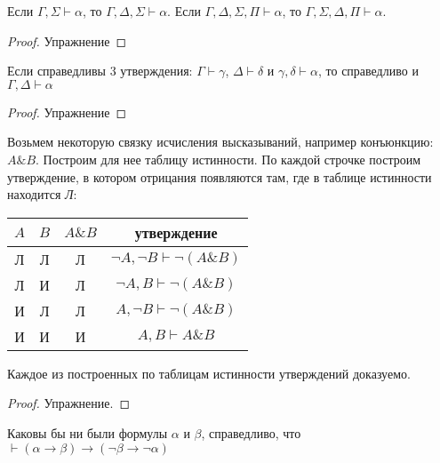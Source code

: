 \begin{lemma}\label{prefix_transposition}
Если $\Gamma, \Sigma \vdash \alpha$, то $\Gamma, \Delta, \Sigma \vdash \alpha$. 
Если $\Gamma, \Delta, \Sigma, \Pi \vdash \alpha$, то $\Gamma, \Sigma, \Delta, \Pi \vdash \alpha$. 
\end{lemma}

\begin{proof}Упражнение\end{proof}

\begin{lemma}
Если справедливы 3 утверждения: $\Gamma \vdash \gamma$, $\Delta \vdash \delta$ и
$\gamma, \delta \vdash \alpha$, то справедливо и $\Gamma, \Delta \vdash \alpha$
\end{lemma}

\begin{proof}
Упражнение
\end{proof}

Возьмем некоторую связку исчисления высказываний, например конъюнкцию: $A \& B$.
Построим для нее таблицу истинности. По каждой строчке построим утверждение,
в котором отрицания появляются там, где в таблице истинности находится \emph{Л}:

\begin{tabular}{cccc}\label{valuation_formula}
$A$ & $B$ & $A \& B$ & утверждение\\
\hline
Л & Л & Л & $\neg A, \neg B \vdash \neg (A \& B)$\\
Л & И & Л & $\neg A, B \vdash \neg (A \& B)$\\
И & Л & Л & $A, \neg B \vdash \neg (A \& B)$\\
И & И & И & $A, B \vdash A \& B$
\end{tabular}

\begin{lemma}
Каждое из построенных по таблицам истинности утверждений доказуемо.
\end{lemma}
\begin{proof} Упражнение.
\end{proof}

\begin{lemma}\label{contraposition}Каковы бы ни были формулы $\alpha$ и $\beta$, справедливо, что 
$\vdash (\alpha \rightarrow \beta) \rightarrow (\neg\beta \rightarrow \neg\alpha)$
\end{lemma}

